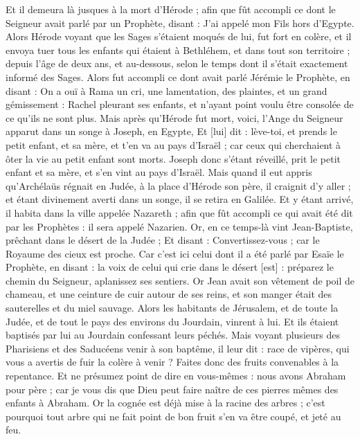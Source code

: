 \begin{multicols}{2}
Et il demeura là jusques à la mort d'Hérode ; afin que fût accompli ce dont le Seigneur avait parlé par un Prophète, disant : J'ai appelé mon Fils hors d'Egypte.
Alors Hérode voyant que les Sages s'étaient moqués de lui, fut fort en colère, et il envoya tuer tous les enfants qui étaient à Bethléhem, et dans tout son territoire ; depuis l'âge de deux ans, et au-dessous, selon le temps dont il s'était exactement informé des Sages.
Alors fut accompli ce dont avait parlé Jérémie le Prophète, en disant :
On a ouï à Rama un cri, une lamentation, des plaintes, et un grand gémissement : Rachel pleurant ses enfants, et n'ayant point voulu être consolée de ce qu'ils ne sont plus.
Mais après qu'Hérode fut mort, voici, l'Ange du Seigneur apparut dans un songe à Joseph, en Egypte,
Et [lui] dit : lève-toi, et prends le petit enfant, et sa mère, et t'en va au pays d'Israël ; car ceux qui cherchaient à ôter la vie au petit enfant sont morts.
Joseph donc s'étant réveillé, prit le petit enfant et sa mère, et s'en vint au pays d'Israël.
Mais quand il eut appris qu'Archélaüs régnait en Judée, à la place d'Hérode son père, il craignit d'y aller ; et étant divinement averti dans un songe, il se retira en Galilée.
Et y étant arrivé, il habita dans la ville appelée Nazareth ; afin que fût accompli ce qui avait été dit par les Prophètes : il sera appelé Nazarien.
\VerseOne{}Or, en ce temps-là vint Jean-Baptiste, prêchant dans le désert de la Judée ;
Et disant : Convertissez-vous ; car le Royaume des cieux est proche.
Car c'est ici celui dont il a été parlé par Esaïe le Prophète, en disant : la voix de celui qui crie dans le désert [est] : préparez le chemin du Seigneur, aplanissez ses sentiers.
Or Jean avait son vêtement de poil de chameau, et une ceinture de cuir autour de ses reins, et son manger était des sauterelles et du miel sauvage.
Alors les habitants de Jérusalem, et de toute la Judée, et de tout le pays des environs du Jourdain, vinrent à lui.
Et ils étaient baptisés par lui au Jourdain confessant leurs péchés.
Mais voyant plusieurs des Pharisiens et des Saducéens venir à son baptême, il leur dit : race de vipères, qui vous a avertis de fuir la colère à venir ?
Faites donc des fruits convenables à la repentance.
Et ne présumez point de dire en vous-mêmes : nous avons Abraham pour père ; car je vous dis que Dieu peut faire naître de ces pierres mêmes des enfants à Abraham.
Or la cognée est déjà mise à la racine des arbres ; c'est pourquoi tout arbre qui ne fait point de bon fruit s'en va être coupé, et jeté au feu.

\end{multicols}
